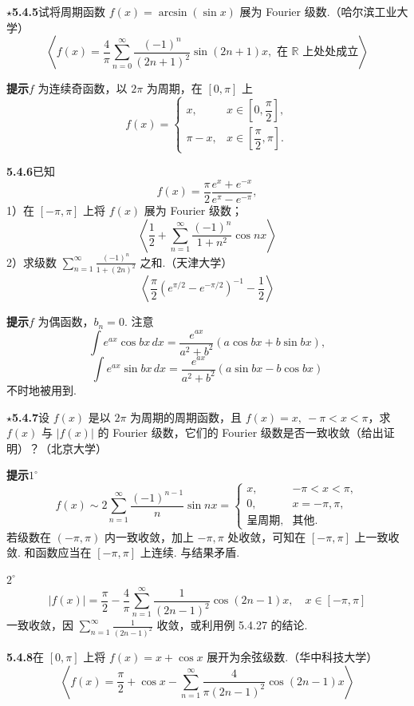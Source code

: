 \documentclass[UTF8, 12pt, fontset=fandol, oneside]{ctexart}
\begin{document}
\noindent\(\star\)\textbf{5.4.5}\quad 试将周期函数 $f(x)=\arcsin(\sin x)$ 展为 Fourier 级数.（哈尔滨工业大学）
\[
  \left\langle
  f(x)=\frac4\pi\sum_{n=0}^{\infty}\frac{(-1)^n}{(2n+1)^2}\sin(2n+1)x,
  \text{ 在 }\mathbb R\text{ 上处处成立}
  \right\rangle
\]

\noindent\textbf{提示}\quad $f$ 为连续奇函数，以 $2\pi$ 为周期，在 $[0,\pi]$ 上
\[
  f(x)=
  \begin{cases}
  x,&x\in\left[0,\dfrac{\pi}{2}\right],\\
  \pi-x,&x\in\left[\dfrac{\pi}{2},\pi\right].
  \end{cases}
\]

\noindent\textbf{5.4.6}\quad 已知
\[
  f(x)=\frac{\pi}{2}\frac{e^x+e^{-x}}{e^{\pi}-e^{-\pi}},
\]
1）在 $[-\pi,\pi]$ 上将 $f(x)$ 展为 Fourier 级数；
\[
  \left\langle \frac12+\sum_{n=1}^{\infty}\frac{(-1)^n}{1+n^2}\cos nx\right\rangle
\]
2）求级数 $\displaystyle\sum_{n=1}^{\infty}\frac{(-1)^n}{1+(2n)^2}$ 之和.（天津大学）
\[
  \left\langle \frac{\pi}{2}\left(e^{\pi/2}-e^{-\pi/2}\right)^{-1}-\frac12\right\rangle
\]

\noindent\textbf{提示}\quad $f$ 为偶函数，$b_n=0$. 注意
\[
  \int e^{ax}\cos bx\,dx=\frac{e^{ax}}{a^2+b^2}(a\cos bx+b\sin bx),
\]
\[
  \int e^{ax}\sin bx\,dx=\frac{e^{ax}}{a^2+b^2}(a\sin bx-b\cos bx)
\]
不时地被用到.

\noindent\(\star\)\textbf{5.4.7}\quad 设 $f(x)$ 是以 $2\pi$ 为周期的周期函数，且 $f(x)=x,\ -\pi<x<\pi$，求 $f(x)$ 与
$|f(x)|$ 的 Fourier 级数，它们的 Fourier 级数是否一致收敛（给出证明）？（北京大学）

\noindent\textbf{提示}\quad $1^\circ$\quad
\[
  f(x)\sim2\sum_{n=1}^{\infty}\frac{(-1)^{n-1}}{n}\sin nx
  =
  \begin{cases}
  x,&-\pi<x<\pi,\\
  0,&x=-\pi,\pi,\\
  \text{呈周期},&\text{其他}.
  \end{cases}
\]
若级数在 $(-\pi,\pi)$ 内一致收敛，加上 $-\pi,\pi$ 处收敛，可知在 $[-\pi,\pi]$ 上一致收敛. 和函数应当在
$[-\pi,\pi]$ 上连续. 与结果矛盾.

$2^\circ$\quad
\[
  |f(x)|=\frac{\pi}{2}-\frac4\pi\sum_{n=1}^{\infty}
  \frac1{(2n-1)^2}\cos(2n-1)x,\quad x\in[-\pi,\pi]
\]
一致收敛，因 $\displaystyle\sum_{n=1}^{\infty}\frac1{(2n-1)^2}$ 收敛，或利用例 5.4.27 的结论.

\noindent\textbf{5.4.8}\quad 在 $[0,\pi]$ 上将 $f(x)=x+\cos x$ 展开为余弦级数.（华中科技大学）
\[
  \left\langle f(x)=\frac{\pi}{2}+\cos x-\sum_{n=1}^{\infty}
  \frac4{\pi(2n-1)^2}\cos(2n-1)x\right\rangle
\]
\end{document}
